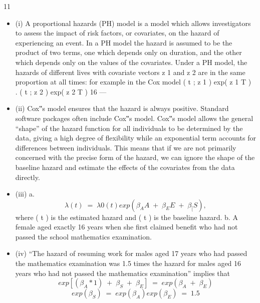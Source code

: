 \documentclass[a4paper,12pt]{article}
\begin{document}
\newpage

11
\begin{itemize}
    \item 
(i) A proportional hazards (PH) model is a model which allows investigators to assess the impact of risk factors, or covariates, on the hazard of experiencing
an event.
In a PH model the hazard is assumed to be the product of two terms, one which depends only on duration, and the other which depends only on the
values of the covariates.
Under a PH model, the hazards of different lives with covariate vectors z 1 and
z 2 are in the same proportion at all times:
for example in the Cox model
\lambda ( t ; z 1 ) exp( \beta z 1 T )

.
\lambda ( t ; z 2 ) exp( \beta z 2 T )
16  — %
\item (ii) Cox‟s model ensures that the hazard is always positive. Standard software packages often include Cox‟s model.
Cox‟s model allows the general “shape” of the hazard function for all individuals to be determined by the data, giving a high degree of flexibility
while an exponential term accounts for differences between individuals.
This means that if we are not primarily concerned with the precise form of the hazard, we can ignore the shape of the baseline hazard and estimate the effects
of the covariates from the data directly.
\item (iii)
a.
\[\lambda ( t )  \; = \;\lambda 0 ( t ) exp( \beta_{A}A  \; + \;\beta_{E} E  \; + \;\beta_[ S ) ,\] where
\lambda ( t )
is the estimated
hazard and  ( t ) is the baseline hazard.
b.
A female aged exactly 16 years when she first claimed benefit who had not passed the school mathematics examination.
\item (iv) “The hazard of resuming work for males aged 17 years who had passed the
mathematics examination was 1.5 times the hazard for males aged 16 years who had not passed the mathematics examination” implies that
\[exp[( \beta_{A}*1)  \; + \;\beta_{S}  \; + \;\beta_{E} ]
 \; = \;exp( \beta_{A} \; + \;\beta_{E} )\]
\[exp( \beta_{S} )
 \; = \;exp( \beta_{A}) exp( \beta_{E} )  \; = \;1.5\]


\end{itemize}
\end{document}

